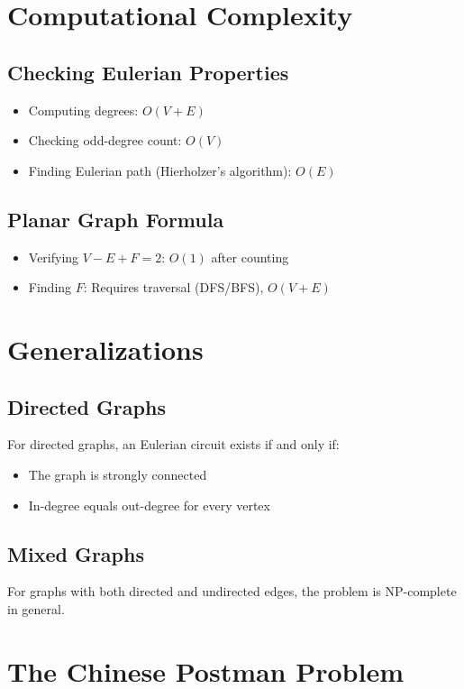 \section{Computational Complexity}

\subsection{Checking Eulerian Properties}
\begin{itemize}
\item Computing degrees: $O(V + E)$
\item Checking odd-degree count: $O(V)$
\item Finding Eulerian path (Hierholzer's algorithm): $O(E)$
\end{itemize}

\subsection{Planar Graph Formula}
\begin{itemize}
\item Verifying $V - E + F = 2$: $O(1)$ after counting
\item Finding $F$: Requires traversal (DFS/BFS), $O(V + E)$
\end{itemize}

\section{Generalizations}

\subsection{Directed Graphs}
For directed graphs, an Eulerian circuit exists if and only if:
\begin{itemize}
\item The graph is strongly connected
\item In-degree equals out-degree for every vertex
\end{itemize}

\subsection{Mixed Graphs}
For graphs with both directed and undirected edges, the problem is NP-complete in general.

\section{The Chinese Postman Problem}

